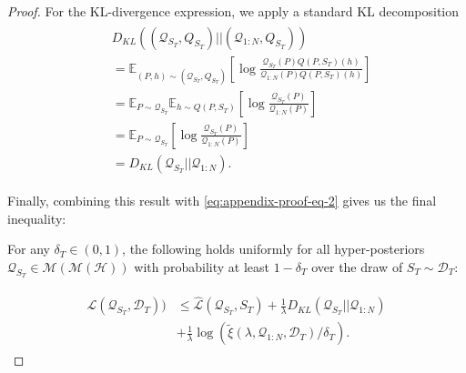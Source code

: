 \documentclass{article} %
\theoremstyle{definition}
\newcommand{\Expect}[2]{\mathbb{E}_{#1}\left [#2 \right ]}
\begin{document}
\begin{proof}
	For the KL-divergence expression, we apply a standard KL decomposition
%	
	\begin{align*}
	\begin{split}
	&D_{KL}((\mathcal{Q}_{S_T}, Q_{S_T})||(\mathcal{Q}_{1:N}, Q_{S_T}))\\
	&=\Expect{(P,h)\sim (\mathcal{Q}_{S_T},Q_{S_T})}{\log\frac{\mathcal{Q}_{S_T}(P)Q(P, S_T)(h)}{\mathcal{Q}_{1:N}(P)Q(P, S_T)(h)}}\\
	&=\mathbb{E}_{P\sim \mathcal{Q}_{S_T}}\Expect{h\sim Q(P,S_T)}{\log\frac{\mathcal{Q}_{S_T}(P)}{\mathcal{Q}_{1:N}(P)}}\\
	&=\Expect{P\sim \mathcal{Q}_{S_T}}{\log\frac{\mathcal{Q}_{S_T}(P)}{\mathcal{Q}_{1:N}(P)}}\\
	&=D_{KL}(\mathcal{Q}_{S_T}||\mathcal{Q}_{1:N}) .
	\end{split}
	\end{align*}
	
	Finally, combining this result with \eqref{eq:appendix-proof-eq-2} gives us the final inequality:
	
	For any $\delta_T \in (0,1)$, the following holds uniformly for all hyper-posteriors $\mathcal{Q}_{S_T}\in \mathcal{M}(\mathcal{M}(\mathcal{H}))$ with probability at least $1-\delta_T$ over the draw of $S_T\sim \mathcal{D}_T$:
	
	\begin{align*}
	\begin{split}
	\mathcal{L}(\mathcal{Q}_{S_T}, \mathcal{D}_T)) &\leq \hat{\mathcal{L}}(\mathcal{Q}_{S_T}, S_T) + \frac{1}{\lambda}D_{KL}(\mathcal{Q}_{S_T}||\mathcal{Q}_{1:N})\\
	&+\frac{1}{\lambda}\log\left (\tilde{\xi}(\lambda,\mathcal{Q}_{1:N},\mathcal{D}_T)/\delta_T\right ) .
	\end{split}
	\end{align*}
	\end{proof}
	
\end{document}
